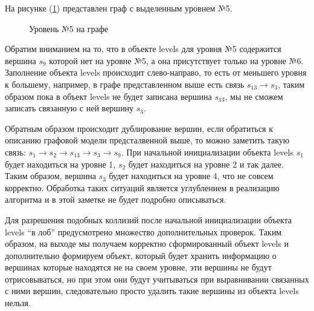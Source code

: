 На рисунке (\ref{fig:main_graph_level5}) представлен граф с выделенным уровнем №5.

\begin{figure}[ht!]
\caption{Уровень №5 на графе}\label{fig:main_graph_level5}
\end{figure}

Обратим вниманием на то, что в объекте levels для уровня №5 содержится вершина $s_9$ которой нет на уровне №5, а она присутствует только на уровне №6. Заполнение объекта levels происходит слево-направо, то есть от меньшего
уровня к большему, например, в графе представленном выше есть связь $s_{13} \rightarrow s_3$, таким образом пока в объект levels не будет записана вершина $s_{13}$, мы не сможем записать связанную с ней вершину $s_3$.

Обратным образом происходит дублирование вершин, если обратиться к описанию графовой модели предсталвенной выше, то можно заметить такую связь: $s_1 \rightarrow s_2 \rightarrow s_{13} \rightarrow s_3 \rightarrow s_9$. При начальной инициализации объекта levels $s_1$ будет находиться на уровне 1, $s_2$ будет находиться на уровне 2 и так далее. Таким образом, вершина $s_3$ будет находиться на уровне 4, что не совсем корректно. Обработка таких ситуаций является углублением в реализацию алгоритма и в этой заметке не будет подробно описываться.

Для разрешения подобных коллизий после начальной инициализации объекта levels ``в лоб'' предусмотрено множество дополнительных проверок. Таким образом, на выходе мы получаем корректно сформированный объект levels и дополнительно формируем объект, который будет хранить информацию о вершинах которые находятся не на своем уровне, эти вершины не будут отрисовываться, но при этом они будут учитываться при выравнивании связанных с ними вершин, следовательно просто удалить такие вершины из объекта levels нельзя.

